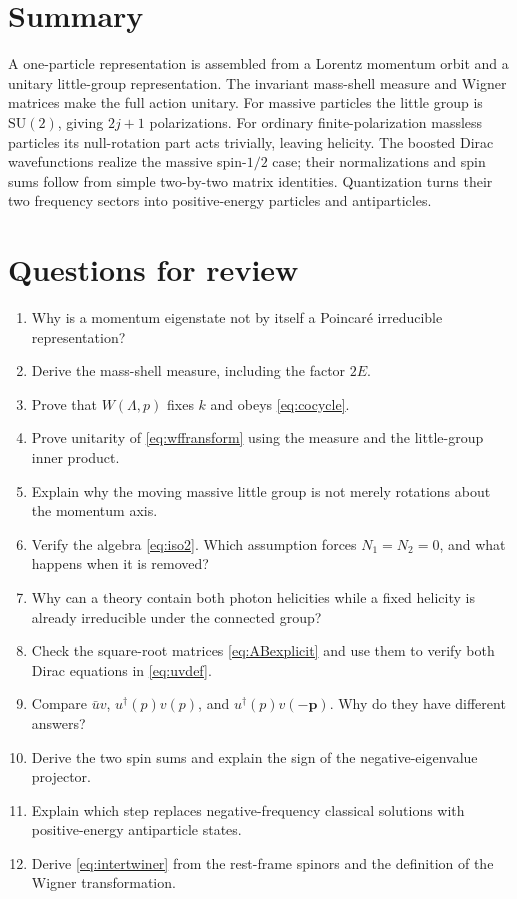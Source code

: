 \documentclass[11pt]{article}
\newcommand{\SU}{\mathrm{SU}}
\begin{document}
\section*{Summary}
A one-particle representation is assembled from a Lorentz momentum
orbit and a unitary little-group representation. The invariant
mass-shell measure and Wigner matrices make the full action unitary.
For massive particles the little group is \(\SU(2)\), giving
\(2j+1\) polarizations. For ordinary finite-polarization massless
particles its null-rotation part acts trivially, leaving helicity.
The boosted Dirac wavefunctions realize the massive spin-\(1/2\)
case; their normalizations and spin sums follow from simple
two-by-two matrix identities. Quantization turns their two frequency
sectors into positive-energy particles and antiparticles.

\newpage
\section*{Questions for review}
\begin{enumerate}
\item Why is a momentum eigenstate not by itself a Poincar\'e
irreducible representation?
\item Derive the mass-shell measure, including the factor \(2E\).
\item Prove that \(W(\Lambda,p)\) fixes \(k\) and obeys
\eqref{eq:cocycle}.
\item Prove unitarity of \eqref{eq:wffransform} using the measure and
the little-group inner product.
\item Explain why the moving massive little group is not merely
rotations about the momentum axis.
\item Verify the algebra \eqref{eq:iso2}. Which assumption forces
\(N_1=N_2=0\), and what happens when it is removed?
\item Why can a theory contain both photon helicities while a fixed
helicity is already irreducible under the connected group?
\item Check the square-root matrices \eqref{eq:ABexplicit} and use
them to verify both Dirac equations in \eqref{eq:uvdef}.
\item Compare \(\bar u v\), \(u^\dagger(p)v(p)\), and
\(u^\dagger(p)v(-\bm p)\). Why do they have different answers?
\item Derive the two spin sums and explain the sign of the
negative-eigenvalue projector.
\item Explain which step replaces negative-frequency classical
solutions with positive-energy antiparticle states.
\item Derive \eqref{eq:intertwiner} from the rest-frame spinors and
the definition of the Wigner transformation.
\end{enumerate}
\end{document}
